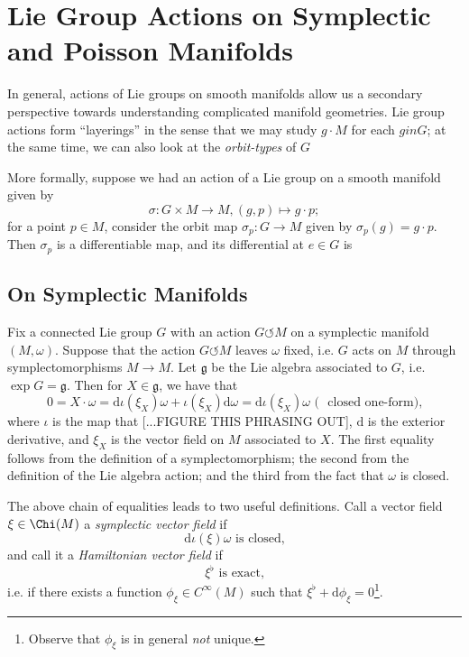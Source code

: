 \documentclass{tufte-handout}
\def\d{\mathrm{d}}
\begin{document}
\section{Lie Group Actions on Symplectic and Poisson Manifolds}
In general, actions of Lie groups on smooth manifolds allow us a secondary perspective towards understanding complicated manifold geometries. Lie group actions form ``layerings'' in the sense that we may study $g \cdot M$ for each $g in G$; at the same time, we can also look at the \emph{orbit-types} of $G$ %

More formally, suppose we had an action of a Lie group on a smooth manifold given by
$$
\sigma: G \times M \to M, (g,p) \mapsto g \cdot p;
$$
for a point $p \in M$, consider the orbit map $\sigma_p: G \to M$ given by $\sigma_p(g) = g \cdot p$. Then $\sigma_p$ is a differentiable map, and its differential at $e \in G$ is %

\subsection{On Symplectic Manifolds}
Fix a connected Lie group $G$ with an action $G \circlearrowleft M$ on a symplectic manifold $(M,\omega)$. Suppose that the action $G \circlearrowleft M$ leaves $\omega$ fixed, i.e. $G$ acts on $M$ through symplectomorphisms $M \to M$. Let $\mathfrak{g}$ be the Lie algebra associated to $G$, i.e. $\exp G = \mathfrak{g}$. Then for $X \in \mathfrak{g}$, we have that
$$
0 = X \cdot \omega = \d \iota(\xi_X)\omega + \iota(\xi_X)\d \omega = \d \iota(\xi_X)\omega \mbox{ (~ closed one-form),}
$$
where $\iota$ is the map that [...FIGURE THIS PHRASING OUT], $\d$ is the exterior derivative, and $\xi_X$ is the vector field on $M$ associated to $X$. The first equality follows from the definition of a symplectomorphism; the second from the definition of the Lie algebra action; and the third from the fact that $\omega$ is closed. %

The above chain of equalities leads to two useful definitions. Call a vector field $\xi \in \Chi(M)$ a \emph{symplectic vector field} if
$$
\d \iota(\xi)\omega \mbox{ is closed,}
$$
and call it a \emph{Hamiltonian vector field} if
$$
\xi^\flat \mbox{ is exact,}
$$
i.e. if there exists a function $\phi_\xi \in C^\infty(M)$ such that $\xi^\flat + \d \phi_\xi = 0$\footnote{Observe that $\phi_\xi$ is in general \emph{not} unique.}.
\end{document}
